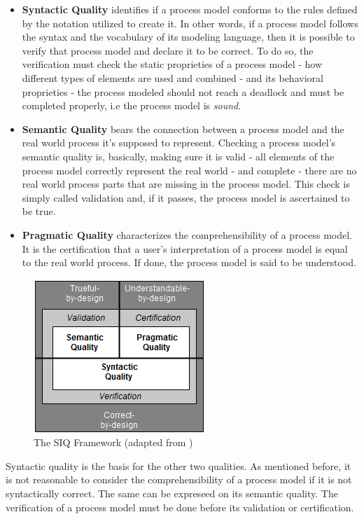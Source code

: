 \documentclass[a4paper,twoside]{article}
\begin{document}
\begin{itemize}
	\item \textbf{Syntactic Quality} identifies if a process model conforms to the rules defined by the notation utilized to create it. In other words, if a process model follows the syntax and the vocabulary of its modeling language, then it is possible to verify that process model and declare it to be correct. To do so, the verification must check the static proprieties of a process model - how different types of elements are used and combined - and its behavioral proprieties - the process modeled should not reach a deadlock and must be completed properly, i.e the process model is \textit{sound}.
	\item \textbf{Semantic Quality} bears the connection between a process model and the real world process it's supposed to represent. Checking a process model's semantic quality is, basically, making sure it is valid - all elements of the process model correctly represent the real world - and complete - there are no real world process parts that are missing in the process model. This check is simply called validation and, if it passes, the process model is ascertained to be true.
	\item \textbf{Pragmatic Quality} characterizes the comprehensibility of a process model. It is the certification that a user's interpretation of a process model is equal to the real world process. If done, the process model is said to be understood.
\end{itemize}


\begin{figure}
	\centering
	\includegraphics[scale=0.8]{SIQFramework.png}
	\caption{The SIQ Framework (adapted from \cite{Reijers2015})}
	\label{SIQFigure}
\end{figure}

Syntactic quality is the basis for the other two qualities. As mentioned before, it is not reasonable to consider the comprehensibility of a process model if it is not syntactically correct. The same can be expreseed on its semantic quality. The verification of a process model must be done before its validation or certification.
\end{document}
